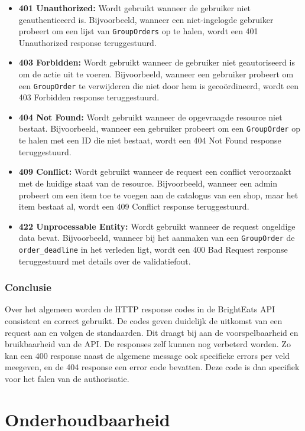 \begin{itemize}
  \item \textbf{401 Unauthorized:} Wordt gebruikt wanneer de gebruiker niet geauthenticeerd is. Bijvoorbeeld, wanneer een niet-ingelogde gebruiker probeert om een lijst van \texttt{GroupOrders} op te halen, wordt een 401 Unauthorized response teruggestuurd.
  \item \textbf{403 Forbidden:} Wordt gebruikt wanneer de gebruiker niet geautoriseerd is om de actie uit te voeren. Bijvoorbeeld, wanneer een gebruiker probeert om een \texttt{GroupOrder} te verwijderen die niet door hem is gecoördineerd, wordt een 403 Forbidden response teruggestuurd.
  \item \textbf{404 Not Found:} Wordt gebruikt wanneer de opgevraagde resource niet bestaat. Bijvoorbeeld, wanneer een gebruiker probeert om een \texttt{GroupOrder} op te halen met een ID die niet bestaat, wordt een 404 Not Found response teruggestuurd.
  \item \textbf{409 Conflict:} Wordt gebruikt wanneer de request een conflict veroorzaakt met de huidige staat van de resource. Bijvoorbeeld, wanneer een admin probeert om een item toe te voegen aan de catalogus van een shop, maar het item bestaat al, wordt een 409 Conflict response teruggestuurd.
  \item \textbf{422 Unprocessable Entity:} Wordt gebruikt wanneer de request ongeldige data bevat. Bijvoorbeeld, wanneer bij het aanmaken van een \texttt{GroupOrder} de \texttt{order\_deadline} in het verleden ligt, wordt een 400 Bad Request response teruggestuurd met details over de validatiefout.
\end{itemize}

\subsubsection{Conclusie}

Over het algemeen worden de HTTP response codes in de BrightEats API consistent en correct gebruikt. De codes geven duidelijk de uitkomst van een request aan en volgen de standaarden. Dit draagt bij aan de voorspelbaarheid en bruikbaarheid van de API. De responses zelf kunnen nog verbeterd worden. Zo kan een 400 response naast de algemene message ook specifieke errors per veld meegeven, en de 404 response een error code bevatten. Deze code is dan specifiek voor het falen van de authorisatie.

\section{Onderhoudbaarheid}

